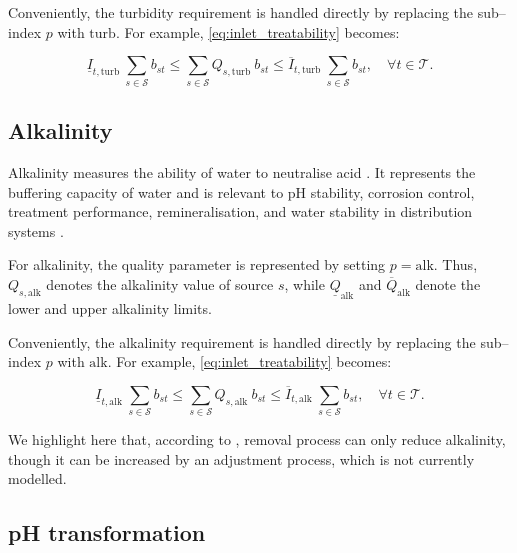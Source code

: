 Conveniently, the turbidity requirement is handled directly by replacing the sub–index $p$ with $\mathrm{turb}$.
For example, \eqref{eq:inlet_treatability} becomes:

\begin{equation*}
    \underline{I}_{t,\mathrm{turb}} ~\sum_{s \in \mathcal{S}} b_{st}
    \le \sum_{s \in \mathcal{S}}
    Q_{s,\mathrm{turb}} ~b_{st} \le \overline{I}_{t,\mathrm{turb}} ~\sum_{s \in \mathcal{S}} b_{st}, \quad \forall t \in \mathcal{T}.
\end{equation*}

\subsection{Alkalinity}

Alkalinity measures the ability of water to neutralise acid \cite{ADWG2011, TestNeeds2025Alkalinity, PerfectWater2025Alkalinity}.
It represents the buffering capacity of water and is relevant to $\mathrm{pH}$ stability, corrosion control, treatment performance, remineralisation, and water stability in distribution systems \cite{ADWG2011, PerfectWater2025Alkalinity}.

For alkalinity, the quality parameter is represented by setting $p = \mathrm{alk}$.
Thus, $Q_{s,\mathrm{alk}}$ denotes the alkalinity value of source $s$, while $\underline{Q}_{\mathrm{alk}}$ and $\overline{Q}_{\mathrm{alk}}$ denote the lower and upper alkalinity limits.

Conveniently, the alkalinity requirement is handled directly by replacing the sub–index $p$ with $\mathrm{alk}$.
For example, \eqref{eq:inlet_treatability} becomes:

\begin{equation*}
    \underline{I}_{t,\mathrm{alk}} ~\sum_{s \in \mathcal{S}} b_{st}
    \le \sum_{s \in \mathcal{S}}
    Q_{s,\mathrm{alk}} ~b_{st} \le \overline{I}_{t,\mathrm{alk}} ~\sum_{s \in \mathcal{S}} b_{st}, \quad \forall t \in \mathcal{T}.
\end{equation*}

We highlight here that, according to \cite{who2004water}, removal process can only reduce alkalinity, though it can be increased by an adjustment process, which is not currently modelled.


\subsection{pH transformation}

